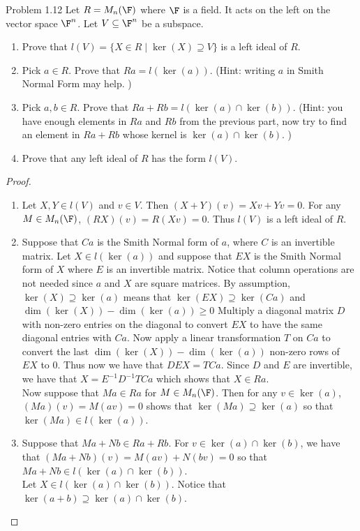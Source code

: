 \documentclass[a4paper]{article}
\begin{document}
\begin{ex}{Problem 1.12}{} Let $R=M_n(\F)$ where $\F$ is a field. It acts on the left on the vector space $\F^n$. Let $V\subseteq\F^n$ be a subspace. 
\begin{enumerate}
\item Prove that $l(V)=\{X\in R\;|\;\ker(X)\supseteq V\}$ is a left ideal of $R$. 
\item Pick $a\in R$. Prove that $Ra=l(\ker(a))$. (Hint: writing $a$ in Smith Normal Form may help. )
\item Pick $a,b\in R$. Prove that $Ra+Rb=l(\ker(a)\cap\ker(b))$. (Hint: you have enough elements in $Ra$ and $Rb$ from the previous part, now try to find an element in $Ra+Rb$ whose kernel is $\ker(a)\cap\ker(b)$. )
\item Prove that any left ideal of $R$ has the form $l(V)$. 
\end{enumerate} 
\begin{proof}~\\
\begin{enumerate}
\item Let $X,Y\in l(V)$ and $v\in V$. Then $(X+Y)(v)=Xv+Yv=0$. For any $M\in M_n(\F)$, $(RX)(v)=R(Xv)=0$. Thus $l(V)$ is a left ideal of $R$. 
\item Suppose that $Ca$ is the Smith Normal form of $a$, where $C$ is an invertible matrix. Let $X\in l(\ker(a))$ and suppose that $EX$ is the Smith Normal form of $X$ where $E$ is an invertible matrix. Notice that column operations are not needed since $a$ and $X$ are square matrices. By assumption, $\ker(X)\supseteq\ker(a)$ means that $\ker(EX)\supseteq\ker(Ca)$ and $\dim(\ker(X))-\dim(\ker(a))\geq 0$ Multiply a diagonal matrix $D$ with non-zero entries on the diagonal to convert $EX$ to have the same diagonal entries with $Ca$. Now apply a linear transformation $T$ on $Ca$ to convert the last $\dim(\ker(X))-\dim(\ker(a))$ non-zero rows of $EX$ to $0$. Thus now we have that $DEX=TCa$. Since $D$ and $E$ are invertible, we have that $X=E^{-1}D^{-1}TCa$ which shows that $X\in Ra$. \\

Now suppose that $Ma\in Ra$ for $M\in M_n(\F)$. Then for any $v\in\ker(a)$, $(Ma)(v)=M(av)=0$ shows that $\ker(Ma)\supseteq\ker(a)$ so that $\ker(Ma)\in l(\ker(a))$. 

\item Suppose that $Ma+Nb\in Ra+Rb$. For $v\in\ker(a)\cap\ker(b)$, we have that $(Ma+Nb)(v)=M(av)+N(bv)=0$ so that $Ma+Nb\in l(\ker(a)\cap\ker(b))$. \\

Let $X\in l(\ker(a)\cap\ker(b))$. Notice that $\ker(a+b)\supseteq\ker(a)\cap\ker(b)$. 
\end{enumerate}
\end{proof}
\end{ex}
\end{document}
